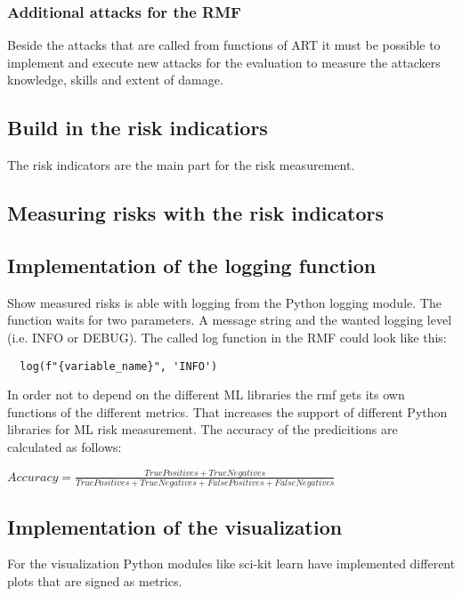 \subsubsection*{Additional attacks for the RMF}

Beside the attacks that are called from functions of ART it must be possible to implement and execute new attacks for the evaluation to measure the attackers knowledge, skills and extent
of damage.

\subsection{Build in the risk indicatiors}

The risk indicators are the main part for the risk measurement.

\subsection{Measuring risks with the risk indicators}

\subsection{Implementation of the logging function}

Show measured risks is able with logging from the Python logging module. The function waits for two parameters. A message string and the wanted logging level (i.e. INFO or DEBUG). The called log function in the RMF could look like this:
\begin{lstlisting}
  log(f"{variable_name}", 'INFO')
\end{lstlisting}

In order not to depend on the different ML libraries the rmf gets its own functions of the different metrics. That increases the support of different Python libraries for ML risk
measurement. The accuracy of the predicitions are calculated as follows: \\
\begin{center}
  $Accuracy = \frac{True Positives + True Negatives}{True Positives + True Negatives + False Positives + False Negatives}$
\end{center}

\subsection{Implementation of the visualization}

For the visualization Python modules like sci-kit learn have implemented different plots that are signed as metrics.
